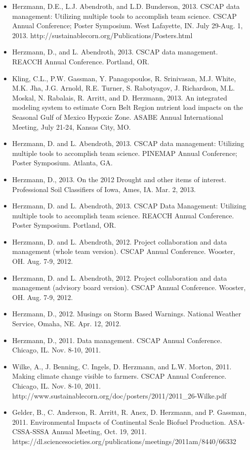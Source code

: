 \begin{itemize}
\item Herzmann, D.E., L.J. Abendroth, and L.D. Bunderson, 2013. CSCAP data management: Utilizing multiple tools to accomplish team science. CSCAP Annual Conference; Poster Symposium. West Lafayette, IN. July 29-Aug. 1, 2013. http://sustainablecorn.org/Publications/Posters.html
\item Herzmann, D., and L. Abendroth, 2013. CSCAP data management. REACCH Annual Conference. Portland, OR. 
\item Kling, C.L., P.W. Gassman, Y. Panagopoulos, R. Srinivasan, M.J. White, M.K. Jha, J.G. Arnold, R.E. Turner, S. Rabotyagov, J. Richardson, M.L. Moskal, N. Rabalais, R. Arritt, and D. Herzmann, 2013. An integrated modeling system to estimate Corn Belt Region nutrient load impacts on the Seasonal Gulf of Mexico Hypoxic Zone. ASABE Annual International Meeting, July 21-24, Kansas City, MO. 
\item Herzmann, D. and L. Abendroth, 2013. CSCAP data management: Utilizing multiple tools to accomplish team science. PINEMAP Annual Conference; Poster Symposium. Atlanta, GA. 
\item Herzmann, D., 2013. On the 2012 Drought and other items of interest. Professional Soil Classifiers of Iowa, Ames, IA. Mar. 2, 2013.
\item Herzmann, D. and L. Abendroth, 2013. CSCAP Data Management: Utilizing multiple tools to accomplish team science. REACCH Annual Conference. Poster Symposium. Portland, OR.
\item Herzmann, D. and L. Abendroth, 2012. Project collaboration and data management (whole team version). CSCAP Annual Conference. Wooster, OH. Aug. 7-9, 2012. 
\item Herzmann, D. and L. Abendroth, 2012. Project collaboration and data management (advisory board version). CSCAP Annual Conference. Wooster, OH. Aug. 7-9, 2012.
\item Herzmann, D., 2012. Musings on Storm Based Warnings. National Weather Service, Omaha, NE. Apr. 12, 2012.
\item Herzmann, D., 2011. Data management. CSCAP Annual Conference. Chicago, IL. Nov. 8-10, 2011. 
\item Wilke, A., J. Benning, C. Ingels, D. Herzmann, and L.W. Morton, 2011. Making climate change visible to farmers. CSCAP Annual Conference. Chicago, IL. Nov. 8-10, 2011. http://www.sustainablecorn.org/doc/posters/2011/2011\_26-Wilke.pdf
\item Gelder, B., C. Anderson, R. Arritt, R. Anex, D. Herzmann, and P. Gassman, 2011. Environmental Impacts of Continental Scale Biofuel Production.  ASA-CSSA-SSSA Annual Meeting, Oct. 19, 2011. https://dl.sciencesocieties.org/publications/meetings/2011am/8440/66332

\end{itemize}
